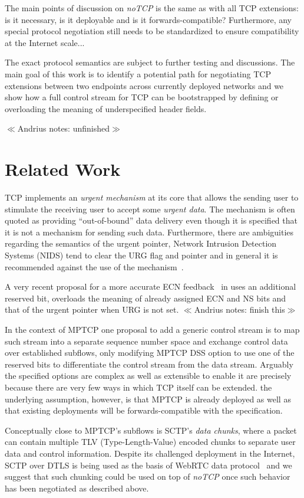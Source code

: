 \documentclass{sig-alternate-10pt}
\newcommand{\authnote}[2]{{ $\ll$\textsf{\footnotesize #1 notes: #2}$\gg$}}
\newcommand{\authnote}[2]{}
\newcommand{\Anote}[1]{{\authnote{Andrius}{#1}}}
\begin{document}
The main points of discussion on \emph{noTCP} is the same as with all TCP extensions: is it necessary, is it deployable and is it forwards-compatible? Furthermore, any special protocol negotiation still needs to be standardized to ensure compatibility at the Internet scale...

The exact protocol semantics are subject to further testing and discussions. The main goal of this work is to identify a potential path for negotiating TCP extensions between two endpoints across currently deployed networks and we show how a full control stream for TCP can be bootstrapped by defining or overloading the meaning of underspecified header fields.

\Anote{unfinished}

\section{Related Work}
\label{sec:related}

TCP implements an \emph{urgent mechanism} at its core that allows the sending user to stimulate the receiving user to accept some \emph{urgent data}. The mechanism is often quoted as providing ``out-of-bound'' data delivery even though it is specified that it is not a mechanism for sending such data. Furthermore, there are ambiguities regarding the semantics of the urgent pointer, Network Intrusion Detection Systems (NIDS) tend to clear the URG flag and pointer and in general it is recommended against the use of the mechanism~\cite{Gont:2011vi}.

A very recent proposal for a more accurate ECN feedback~\cite{Kuhlewind:2014vd} in uses an additional reserved bit, overloads the meaning of already assigned ECN and NS bits and that of the urgent pointer when URG is not set.\Anote{finish this}

In the context of MPTCP one proposal to add a generic control stream is to map such stream into a separate sequence number space and exchange control data over established subflows, only modifying MPTCP DSS option to use one of the reserved bits to differentiate the control stream from the data stream. Arguably the specified options are complex as well as extensible to enable it are precisely because there are very few ways in which TCP itself can be extended. the underlying assumption, however, is that MPTCP is already deployed as well as that existing deployments will be forwards-compatible with the specification.

Conceptually close to MPTCP's subflows is SCTP's \emph{data chunks}, where a packet can contain multiple TLV (Type-Length-Value) encoded chunks to separate user data and control information. Despite its challenged deployment in the Internet, SCTP over DTLS is being used as the basis of WebRTC data protocol~\cite{Tuexen:wv} and we suggest that such chunking could be used on top of \emph{noTCP} once such behavior has been negotiated as described above.
\end{document}

